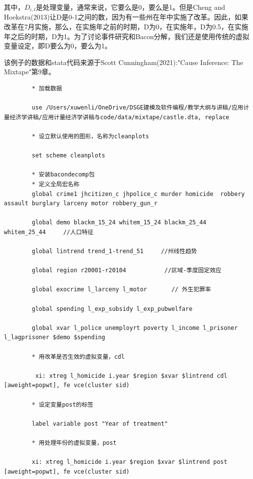 \documentclass[cn,12pt,math=newtx,citestyle=gb7714-2015,bibstyle=gb7714-2015]{elegantbook}
\begin{document}
    其中，$D_{i,t} $是处理变量，通常来说，它要么是0，要么是1。但是Cheng and Hoekstra(2013)让D是0-1之间的数，因为有一些州在年中实施了改革。因此，如果改革在7月实施，那么，在实施年之前的时期，D为0，在实施年，D为0.5，在实施年之后的时期，D为1。为了讨论事件研究和Bacon分解，我们还是使用传统的虚拟变量设定，即D要么为0，要么为1。

    该例子的数据和stata代码来源于Scott Cunningham(2021):"Cause Inference: The Mixtape"第9章。
    
    \begin{lstlisting}
    	* 加载数据
    	
    	use /Users/xuwenli/OneDrive/DSGE建模及软件编程/教学大纲与讲稿/应用计量经济学讲稿/应用计量经济学讲稿与code/data/mixtape/castle.dta, replace
    	
    	* 设立默认使用的图形，名称为cleanplots
    	
    	set scheme cleanplots
    	
    	* 安装bacondecomp包
    	* 定义全局宏名称
    	global crime1 jhcitizen_c jhpolice_c murder homicide  robbery assault burglary larceny motor robbery_gun_r 
    	
    	global demo blackm_15_24 whitem_15_24 blackm_25_44 whitem_25_44     //人口特征
    	
    	global lintrend trend_1-trend_51     //州线性趋势
    	
    	global region r20001-r20104           //区域-季度固定效应
    	
    	global exocrime l_larceny l_motor       // 外生犯罪率
    	
    	global spending l_exp_subsidy l_exp_pubwelfare
    	
    	global xvar l_police unemployrt poverty l_income l_prisoner l_lagprisoner $demo $spending
    	
    	* 用改革是否生效的虚拟变量，cdl
    	
    	 xi: xtreg l_homicide i.year $region $xvar $lintrend cdl [aweight=popwt], fe vce(cluster sid)
    	
    	* 设定变量post的标签
    	
    	label variable post "Year of treatment"
    	
    	* 用处理年份的虚拟变量，post
    	
    	xi: xtreg l_homicide i.year $region $xvar $lintrend post [aweight=popwt], fe vce(cluster sid)
    	
    	
    	
    \end{lstlisting}
\end{document}
